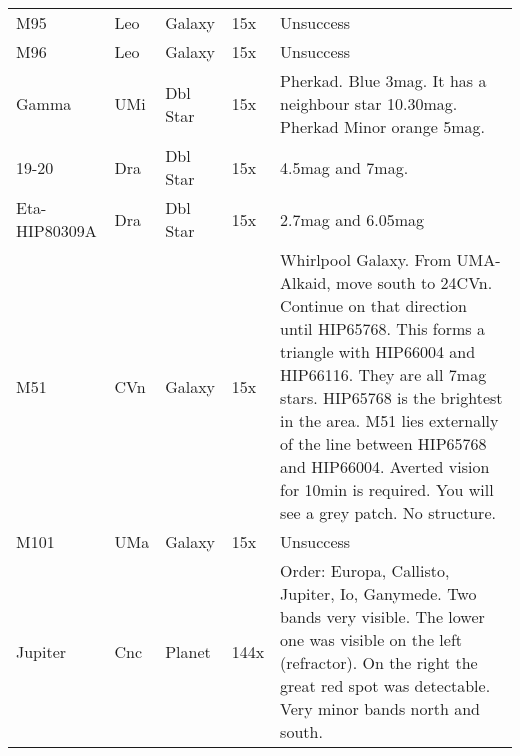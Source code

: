 \begin{longtable}{ p{0.7in}  p{0.3in}  p{0.6in}  p{0.9in}  p{5.8in} }
M95 & Leo & Galaxy & 15x & Unsuccess \\ 
M96 & Leo & Galaxy & 15x & Unsuccess \\ 
Gamma & UMi & Dbl Star & 15x & Pherkad. Blue 3mag. It has a neighbour star 10.30mag. Pherkad Minor orange 5mag. \\ 
19-20 & Dra & Dbl Star & 15x & 4.5mag and 7mag. \\ 
Eta-HIP80309A & Dra & Dbl Star & 15x & 2.7mag and 6.05mag \\ 
M51 & CVn & Galaxy & 15x & Whirlpool Galaxy. From UMA-Alkaid, move south to 24CVn. Continue on that direction until HIP65768. This forms a triangle with HIP66004 and HIP66116. They are all 7mag stars. HIP65768 is the brightest in the area. M51 lies externally of the line between HIP65768 and HIP66004. Averted vision for 10min is required. You will see a grey patch. No structure. \\ 
M101 & UMa & Galaxy & 15x & Unsuccess \\ 
Jupiter & Cnc & Planet & 144x & Order: Europa, Callisto, Jupiter, Io, Ganymede. Two bands very visible. The lower one was visible on the left (refractor). On the right the great red spot was detectable. Very minor bands north and south.  \\ 
\hline 
\end{longtable} 
